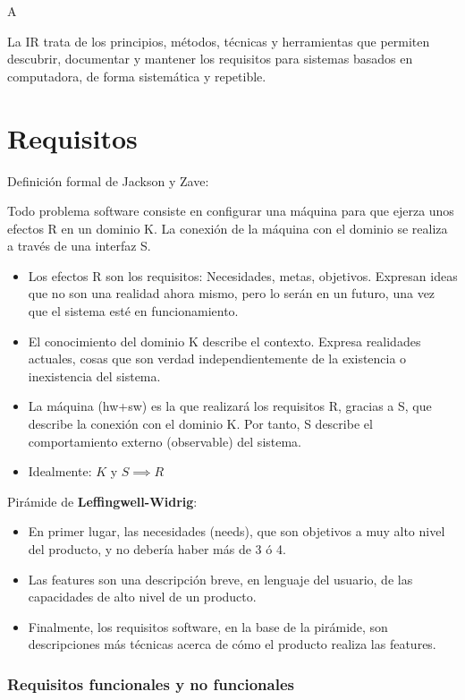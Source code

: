 A%

La IR trata de los principios, métodos, técnicas y herramientas que
permiten descubrir, documentar y mantener los requisitos para sistemas
basados en computadora, de forma sistemática y repetible.

\section{Requisitos}

Definición formal de Jackson y Zave:

Todo problema software consiste en configurar una máquina para que ejerza unos efectos R en
un dominio K. La conexión de la máquina con el dominio se realiza a través de una interfaz S.

\begin{itemize}[noitemsep]
\item Los efectos R son los requisitos: Necesidades, metas,
  objetivos. Expresan ideas que no son una realidad ahora mismo, pero
  lo serán en un futuro, una vez que el sistema esté en
  funcionamiento.
\item El conocimiento del dominio K describe el contexto. Expresa
  realidades actuales, cosas que son verdad independientemente de la
  existencia o inexistencia del sistema.
\item La máquina (hw+sw) es la que realizará los requisitos R, gracias
  a S, que describe la conexión con el dominio K. Por tanto, S
  describe el comportamiento externo (observable) del sistema.
\item Idealmente: $K$ y $S \implies R$
\end{itemize}

Pirámide de \textbf{Leffingwell-Widrig}:
\begin{itemize}[noitemsep]
\item En primer lugar, las necesidades (needs), que son
objetivos a muy alto nivel del producto, y no debería
haber más de 3 ó 4.
\item Las features son una descripción breve, en lenguaje del
usuario, de las capacidades de alto nivel de un producto.
\item Finalmente, los requisitos software, en la base de la
pirámide, son descripciones más técnicas acerca de cómo
el producto realiza las features.
\end{itemize}


\subsubsection{Requisitos funcionales y no funcionales}
\label{sec:requisitos:funcionales-nofuncionales}

